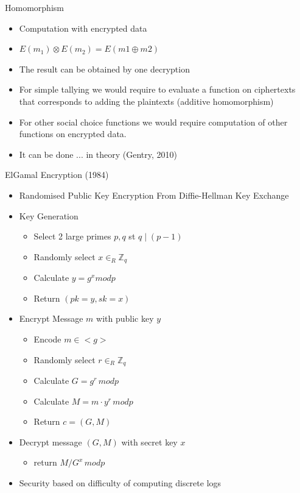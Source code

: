 \documentclass{beamer}
\begin{document}
\begin{frame}{Homomorphism}
\begin{itemize}
\item Computation with encrypted data
\item $E(m_1) \otimes E(m_2) = E(m1 \oplus m2)$
\item The result can be obtained by one decryption
\item For simple tallying we would require to evaluate a function on ciphertexts that corresponds to adding the plaintexts (additive homomorphism)
\item For other social choice functions we would require computation of other functions on encrypted data.
\item It can be done ... in theory (Gentry, 2010)
\end{itemize}
\end{frame}

\begin{frame}{ElGamal Encryption (1984)}
\begin{itemize}
\item Randomised Public Key Encryption From Diffie-Hellman Key Exchange
\item Key Generation
\begin{itemize}
\item Select 2 large primes $p,q$ st $q \mid (p-1)$
\item Randomly select $ x \in_R \mathbb{Z}_q $
\item Calculate $ y = g^x mod p $
\item Return $ (pk = y, sk = x)$
\end{itemize}
\item Encrypt Message $m$ with public key $y$
\begin{itemize}
\item  Encode $m \in <g>$
\item  Randomly select $r \in_R \mathbb{Z}_q$
\item  Calculate $G = g^r \, mod p$
\item  Calculate $M = m \cdot y^r \, mod p$
\item  Return $ c = (G,M)$
\end{itemize}
\item Decrypt message $(G,M)$ with secret key $x$
\begin{itemize}
\item  return $M/G^x \, mod p$
\end{itemize}
\item Security based on difficulty of computing discrete logs
\end{itemize}
\end{frame}
\end{document}
